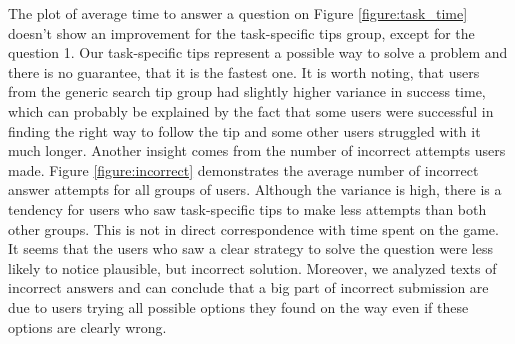 \documentclass{sig-alternate}
\begin{document}
The plot of average time to answer a question on Figure \ref{figure:task_time} doesn't show an improvement for the task-specific tips group, except for the question 1.
Our task-specific tips represent a possible way to solve a problem and there is no guarantee, that it is the fastest one.
It is worth noting, that users from the generic search tip group had slightly higher variance in success time, which can probably be explained by the fact that some users were successful in finding the right way to follow the tip and some other users struggled with it much longer.
Another insight comes from the number of incorrect attempts users made.
Figure \ref{figure:incorrect} demonstrates the average number of incorrect answer attempts for all groups of users.
Although the variance is high, there is a tendency for users who saw task-specific tips to make less attempts than both other groups.
This is not in direct correspondence with time spent on the game.
It seems that the users who saw a clear strategy to solve the question were less likely to notice plausible, but incorrect solution.
Moreover, we analyzed texts of incorrect answers and can conclude that a big part of incorrect submission are due to users trying all possible options they found on the way even if these options are clearly wrong.
\end{document}
